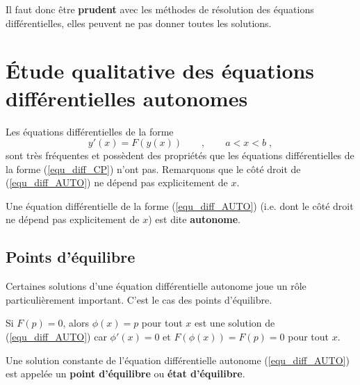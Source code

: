 {\begin{egg}
Il faut donc être {\bfseries prudent} avec les méthodes de résolution des
équations différentielles, elles peuvent ne pas donner toutes les
solutions.
\end{egg}


\section[Équations autonomes \life]{Étude qualitative des équations
différentielles autonomes \life}

Les équations différentielles de la forme
\begin{equation}\label{equ_diff_AUTO}
y'(x) = F(y(x)) \qquad , \qquad a<x<b \; ,
\end{equation}
sont très fréquentes et possèdent des propriétés que les équations
différentielles de la forme (\ref{equ_diff_CP}) n'ont pas.
Remarquons que le côté droit de (\ref{equ_diff_AUTO}) ne dépend pas
explicitement de $x$.

\begin{focus}{\dfn} 
Une équation différentielle de la forme (\ref{equ_diff_AUTO})
(i.e. dont le côté droit ne dépend pas explicitement de $x$) est dite
{\bfseries autonome}.
\end{focus}

\subsection{Points d'équilibre}

Certaines solutions d'une équation différentielle autonome joue un
rôle particulièrement important.  C'est le cas des points d'équilibre.

Si $F(p)=0$, alors $\phi(x) = p$ pour tout $x$ est une solution de
(\ref{equ_diff_AUTO}) car $\phi'(x) = 0$ et
$F(\phi(x)) = F(p) = 0$ pour tout $x$.

\begin{focus}{\dfn} 
Une solution constante de l'équation différentielle autonome
(\ref{equ_diff_AUTO}) est appelée un
{\bfseries point d'équilibre} ou
{\bfseries état d'équilibre}. 
\end{focus}

}
